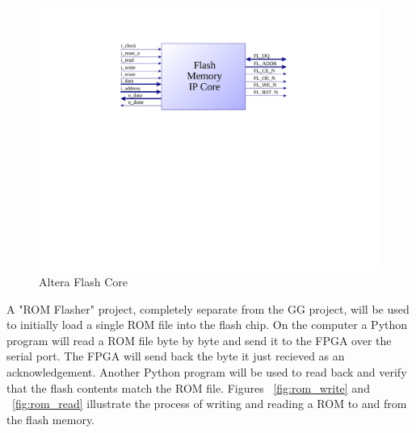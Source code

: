 \documentclass{article}
\begin{document}
\begin{figure}[H]
\centering
\includegraphics[scale=0.5]{flash_core.pdf}
\caption{Altera Flash Core}
\label{fig:flash_core}
\end{figure}

A "ROM Flasher" project, completely separate from the GG project,
will be used to initially load a single ROM file into the flash chip.
On the computer a Python program will read a ROM file byte by byte
and send it to the FPGA over the serial port. The FPGA will send back
the byte it just recieved as an acknowledgement. Another
Python program will be used to read back and verify that the flash contents
match the ROM file. Figures ~\ref{fig:rom_write} and ~\ref{fig:rom_read} 
illustrate the process of writing and reading a ROM to and from the
flash memory.
\end{document}
